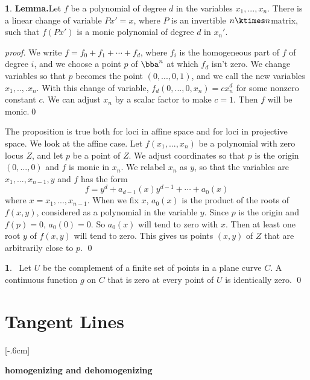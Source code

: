 \documentclass[leqno]{book}
\newcommand\Marginnote[1]{\marginnote{\hspace{-12pt}\normalfont{#1}}}
\renewcommand\theequation{\thesection.\arabic{equation}}
\newenvironment{boldequation}{\renewcommand\theequation{\textbf{\thesection.\arabic{equation}}}\equation}
   {\endequation}
\theoremstyle{definition}%
\numberwithin{equation}{section}
\theoremstyle{theorem} %
\newtheorem{lemma}[equation]{}
\newtheorem{corollary}[equation]{}
\renewenvironment{proof}{\no \emph{proof.}}{}
\begin{document}
\begin{lemma}{\bf Lemma.}\label{polymonic}
Let $f$ be a polynomial of degree $d$ in the
variables $x_1,...,x_n$. There is a linear change of variable $
Px'=x$, where $P$ is an invertible $n\ktimes n$matrix, such that 
$f(Px')$ is a monic polynomial of degree $d$ in $x_n'$.
\end{lemma}

\begin{proof} We write  $f = f_0+f_1+\cdots + f_d$, where $f_i$ is the 
homogeneous part of $f$ of degree $i$, and we choose a point $p$ of
$\bba^n$ at which $f_d$ isn't zero.  We change variables so that $p$
becomes the point $(0,...,0,1)$, and we call the new variables
$x_1,..,.x_n$.  With this change of variable, $f_d(0,...,0,x_n) =
cx_n^d$ for some nonzero constant $c$.  We can adjust $x_n$ by a
scalar factor to make $c=1$.  Then $f$ will be monic.\qed\end{proof}


  The
proposition is true both for loci in affine space and for loci in
projective space.  We look at the affine case.  Let $f(x_1,...,x_n)$
be a polynomial with zero locus $Z$, and let $p$ be a point of $Z$.
We adjust coordinates so that $p$ is the origin $(0,...,0)$ and $f$ is monic
in $x_n$.  We relabel $x_n$ as $y$, so that the variables are
$x_1,...,x_{n-1},y$ and $f$ has the form
$$f = y^d + a_{d-1}(x)y^{d-1} + \cdots + a_0(x)$$ where
$x=x_1,...,x_{n-1}$.  When we fix $x$, $a_0(x)$ is the product of the
roots of $f(x,y)$, considered as a polynomial in the variable $y$.
Since $p$ is the origin and $f(p)=0$, $a_0(0)=0$.  So $a_0(x)$ will
tend to zero with $x$.  Then at least one root $y$ of $f(x,y)$ will
tend to zero.  This gives us points $(x,y)$ of $Z$ that are
arbitrarily close to $p$.  \qed

\begin{corollary}{}\Marginnote{functioniszero}\;\,
Let $U$ be the complement of a finite set of points in a plane curve
$C$.  A continuous function $g$ on $C$ that
is zero at every point of $U$ is identically zero.
\qed \label{functioniszero}\end{corollary}

\section{Tangent Lines} \label{tanlines} \Marginnote{tanlines}[-.6cm]

\vspace{-0.5cm}
\begin{boldequation}
\hspace{-7cm} \textbf{homogenizing and dehomogenizing}
\Marginnote{homdehomone}\label{homdehomone}
\end{boldequation}
\end{document}
